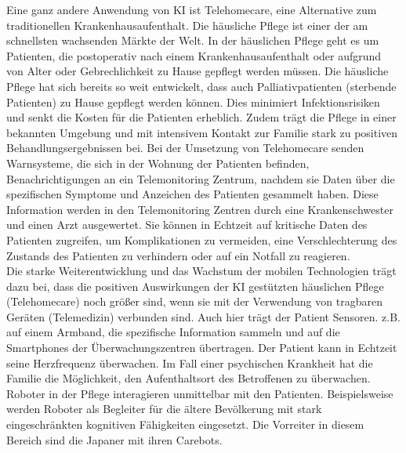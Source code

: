 Eine ganz andere  Anwendung von KI ist Telehomecare, eine Alternative zum traditionellen Krankenhausaufenthalt.\cite{Chapter_14} Die häusliche Pflege ist einer der am schnellsten wachsenden Märkte der Welt.\cite{Chapter_14} In der häuslichen Pflege geht es um Patienten, die postoperativ nach einem Krankenhausaufenthalt oder aufgrund von Alter oder Gebrechlichkeit zu Hause gepflegt werden müssen. Die häusliche Pflege hat sich bereits so weit entwickelt, dass auch Palliativpatienten (sterbende Patienten) zu Hause gepflegt werden können. Dies minimiert Infektionsrisiken und senkt die Kosten für die Patienten erheblich. Zudem trägt die Pflege in einer bekannten Umgebung und mit intensivem Kontakt zur Familie stark zu positiven Behandlungsergebnissen bei.
Bei der Umsetzung von Telehomecare senden Warnsysteme, die sich in der Wohnung der Patienten befinden, Benachrichtigungen an ein Telemonitoring Zentrum, nachdem sie Daten über die spezifischen Symptome und Anzeichen des Patienten gesammelt haben.\cite{Chapter_14} Diese Information werden in den Telemonitoring Zentren durch eine Krankenschwester und einen Arzt ausgewertet. Sie können in Echtzeit auf kritische Daten des Patienten zugreifen, um Komplikationen zu vermeiden, eine Verschlechterung des Zustands des Patienten zu verhindern oder auf ein Notfall zu reagieren.\cite{Chapter_14}\\
Die starke Weiterentwicklung und das Wachstum der mobilen Technologien trägt dazu bei, dass die positiven Auswirkungen der KI gestützten häuslichen Pflege (Telehomecare) noch größer sind, wenn sie mit der Verwendung von tragbaren Geräten (Telemedizin) verbunden sind. Auch hier trägt der Patient Sensoren. z.B. auf einem Armband, die spezifische Information sammeln und auf die Smartphones der Überwachungszentren übertragen. \cite{Chapter_14} Der Patient kann in Echtzeit seine Herzfrequenz überwachen. Im Fall einer psychischen Krankheit hat die Familie die Möglichkeit, den Aufenthaltsort des Betroffenen zu überwachen.\cite{Chapter_14}\\ 

Roboter in der Pflege interagieren unmittelbar mit den Patienten. Beispielsweise werden Roboter als Begleiter für die ältere Bevölkerung mit stark eingeschränkten kognitiven Fähigkeiten eingesetzt. Die Vorreiter in diesem Bereich sind die Japaner mit ihren Carebots.